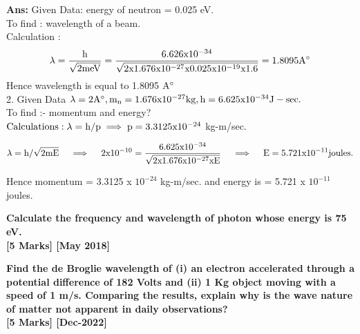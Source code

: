 \documentclass{exam}
\begin{document}
\begin{questions}
\textbf{Ans:} Given Data: energy of neutron = 0.025 eV. \\ 
To find : wavelength of a beam. \\
Calculation :  \\

\begin{equation*} 
\rm  \lambda =  \frac{h}{\sqrt{2meV}} = \frac{6.626 x 10 ^{-34}}{ \sqrt{ 2 x 1.676 x 10 ^{-27} x 0.025 x 10^{-19} x 1.6 } }  =  1.8095 A^{\circ}
\end{equation*}
Hence wavelength is equal to 1.8095 $\rm A^{\circ}$ \\

2. Given Data $ \rm \lambda = 2 A^{\circ}, m_n = 1.676 x 10^{-27} kg, h= 6.625 x 10 ^{-34}  J-sec.$ \\

To find :- momentum and energy? \\
$\rm Calculations: \lambda = h/p \implies   p = 3.3125 x 10^{-24}$ kg-m/sec.

\begin{equation*}
\rm \lambda = h/\sqrt{2mE} \quad \implies \quad 2 x 10^{-10} = \frac{6.625 x 10^{-34}}{\sqrt{2 x 1.676 x 10^{-27} x E}} \quad \implies \quad E = 5.721 x 10^{-11} joules. 
\end{equation*}

 Hence momentum = 3.3125 x $10^{-24}$  kg-m/sec. and energy is = 5.721 x $10^{-11} $ joules.

\question \textbf{ Calculate the frequency and wavelength of photon whose energy is 75 eV. \\  \hfil [5 Marks] [May 2018] }

\question \textbf{ Find the de Broglie wavelength of (i) an electron accelerated through a potential difference of 182 Volts and (ii) 1 Kg object moving with a speed of 1 m/s. Comparing the results, explain why is the wave nature of matter not apparent in daily observations? \\ \hfil [5 Marks] [Dec-2022] } \\


\end{questions}
\end{document}
